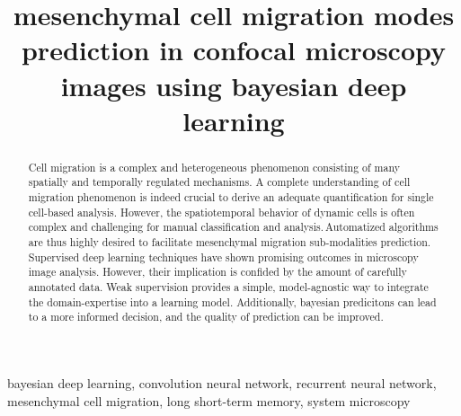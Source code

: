 \documentclass{article}
\title{mesenchymal cell migration modes prediction in confocal microscopy images 
using bayesian deep learning}
\begin{document}
\maketitle
\begin{abstract}

Cell migration is a complex and heterogeneous phenomenon consisting of many spatially and
temporally regulated mechanisms. 
A complete understanding of cell migration phenomenon is indeed crucial to derive an 
adequate quantification for single cell-based analysis. 
However, the spatiotemporal behavior of dynamic cells is often complex and challenging for 
manual classification and analysis.\,Automatized algorithms are thus highly 
desired to facilitate mesenchymal migration sub-modalities prediction. 
Supervised deep learning techniques have shown promising outcomes in microscopy image 
analysis. However, their implication is confided by the amount of carefully annotated data.
Weak supervision provides a simple, model-agnostic way to integrate the domain-expertise   
into a learning model. 
Additionally, bayesian predicitons can lead to a more informed decision, and the quality 
of prediction can be improved.

% 
\end{abstract}
%
\begin{keywords}
bayesian deep learning, convolution neural network, recurrent neural network, mesenchymal cell migration,
long short-term memory, system microscopy 
\end{keywords}
\end{document}

